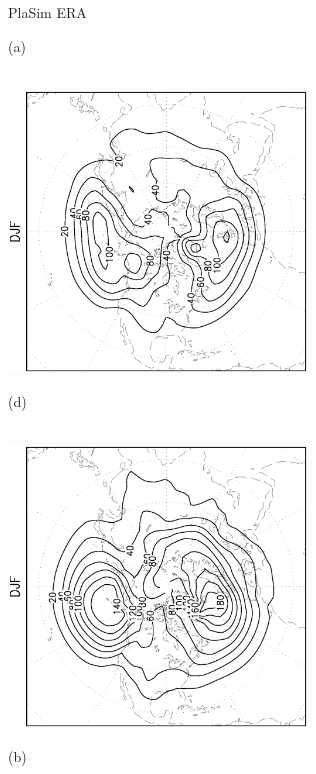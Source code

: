 \documentclass[12pt,a4paper,twoside,openright,headinclude,liststotoc,bibtotoc]{scrreprt}
\begin{document}
\begin{appendix}
\begin{figure}[b]
\hspace{3.5cm}PlaSim \vspace{0.2cm} \hspace{7.3cm} ERA \\
\parbox{8.5cm}{\hspace{0.90cm}\begin{scriptsize}(a)\end{scriptsize} \vspace{-0.5cm} \\
\includegraphics[height=7.5cm,angle=-90]
{eps/PLDJF1000z156fluxes_tr.eps}
}
\parbox{8.5cm}{\hspace{0.95cm}\begin{scriptsize}(d)\end{scriptsize} \vspace{-0.5cm} \\
\includegraphics[height=7.5cm,angle=-90]
{eps/ERA40_Z1000DJF_fluxes_tr.eps}
}
\parbox{8.5cm}{\hspace{0.90cm}\begin{scriptsize}(b)\end{scriptsize} \vspace{-0.2cm} \\
}
\end{figure}
\end{appendix}
\end{document}
